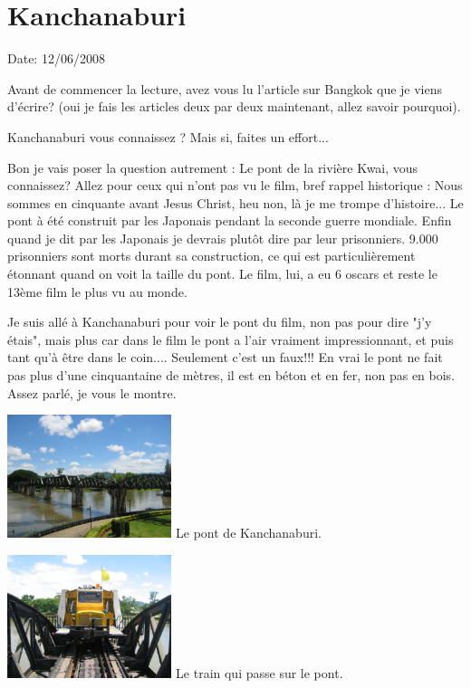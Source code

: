 \section{Kanchanaburi}

Date: 12/06/2008

\begin{multicols}{2}

Avant de commencer la lecture, avez vous lu l'article sur Bangkok que je viens d'écrire? (oui je fais les articles deux par deux maintenant, allez savoir pourquoi).

Kanchanaburi vous connaissez ? Mais si, faites un effort...

Bon je vais poser la question autrement : Le pont de la rivière Kwai, vous connaissez? Allez pour ceux qui n'ont pas vu le film, bref rappel historique : Nous sommes en cinquante avant Jesus Christ, heu non, là je me trompe d'histoire... Le pont à été construit par les Japonais pendant la seconde guerre mondiale. Enfin quand je dit par les Japonais je devrais plutôt dire par leur prisonniers. 9.000 prisonniers sont morts durant sa construction, ce qui est particulièrement étonnant quand on voit la taille du pont. Le film, lui, a eu 6 oscars et reste le 13ème film le plus vu au monde.

Je suis allé à Kanchanaburi pour voir le pont du film, non pas pour dire "j'y étais", mais plus car dans le film le pont a l'air vraiment impressionnant, et puis tant qu'à être dans le coin.... Seulement c'est un faux!!! En vrai le pont ne fait pas plus d'une cinquantaine de mètres, il est en béton et en fer, non pas en bois. Assez parlé, je vous le montre.

\hspace*{-0.65cm}
\includegraphics[width=4.8cm]{articles/Kanchanaburi/1400.jpg}
Le pont de Kanchanaburi.

\hspace*{-0.65cm}
\includegraphics[width=4.8cm]{articles/Kanchanaburi/1401.jpg}
Le train qui passe sur le pont.


\end{multicols}
